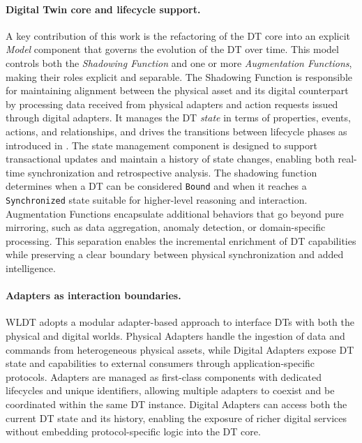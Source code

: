 \paragraph{Digital Twin core and lifecycle support.}
A key contribution of this work is the refactoring of the DT core into an explicit \emph{Model} component that governs the evolution of the DT over time.
%
This model controls both the \emph{Shadowing Function} and one or more \emph{Augmentation Functions}, making their roles explicit and separable.
%
The Shadowing Function is responsible for maintaining alignment between the physical asset and its digital counterpart by processing data received from physical adapters and action requests issued through digital adapters.
%
It manages the DT \emph{state} in terms of properties, events, actions, and relationships, and drives the transitions between lifecycle phases as introduced in .
%
The state management component is designed to support transactional updates and maintain a history of state changes, enabling both real-time synchronization and retrospective analysis.
%
The shadowing function determines when a DT can be considered \texttt{Bound} and when it reaches a \texttt{Synchronized} state suitable for higher-level reasoning and interaction.
%
Augmentation Functions encapsulate additional behaviors that go beyond pure mirroring, such as data aggregation, anomaly detection, or domain-specific processing.
%
This separation enables the incremental enrichment of DT capabilities while preserving a clear boundary between physical synchronization and added intelligence.

\paragraph{Adapters as interaction boundaries.}
WLDT adopts a modular adapter-based approach to interface \acp{DT} with both the physical and digital worlds.
%
Physical Adapters handle the ingestion of data and commands from heterogeneous physical assets, while Digital Adapters expose DT state and capabilities to external consumers through application-specific protocols.
%
Adapters are managed as first-class components with dedicated lifecycles and unique identifiers, allowing multiple adapters to coexist and be coordinated within the same DT instance.
%
Digital Adapters can access both the current DT state and its history, enabling the exposure of richer digital services without embedding protocol-specific logic into the DT core.

